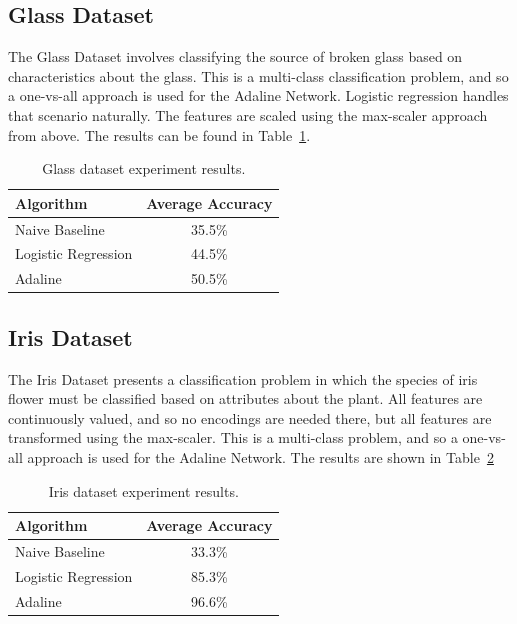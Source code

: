 \documentclass{amsart}
\begin{document}
    \subsection{Glass Dataset}
    The Glass Dataset\cite{glassdataset} involves classifying the source of
    broken glass based on characteristics about the glass. This is a multi-class
    classification problem, and so a one-vs-all approach is used for the
    Adaline Network. Logistic regression handles that scenario naturally.
    The features are scaled using the max-scaler approach from above.
    The results can be found in Table~\ref{glass_results}.
\begin{table}[H]
    \begin{tabular}{lc}
    Algorithm & Average Accuracy \\
    \hline
    Naive Baseline & 35.5\% \\
    Logistic Regression & 44.5\% \\
    Adaline & 50.5\%
    \end{tabular}
    \label{glass_results}
        \caption{Glass dataset experiment results.}
    \end{table}

    \subsection{Iris Dataset}
    The Iris Dataset\cite{irisdataset} presents a classification
    problem in which the species of iris flower must be classified based
    on attributes about the plant. All features are continuously
    valued, and so no encodings are needed there, but all features are transformed
    using the max-scaler. This is a multi-class problem, and so
    a one-vs-all approach is used for the Adaline Network. The results are
    shown in Table~\ref{iris_results}
    \begin{table}[H]
    \begin{tabular}{lc}
    Algorithm & Average Accuracy \\
    \hline
    Naive Baseline & 33.3\% \\
    Logistic Regression & 85.3\% \\
    Adaline & 96.6\%
    \end{tabular}
    \label{iris_results}
        \caption{Iris dataset experiment results.}
    \end{table}
\end{document}
